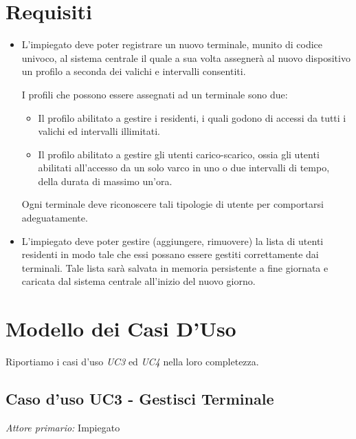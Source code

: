 \documentclass[12pt, letterpaper]{article}
\begin{document}
\section{Requisiti}
\begin{itemize}
    \item L'impiegato deve poter registrare 
    un nuovo terminale, munito di codice 
    univoco, al sistema centrale il quale a 
    sua volta assegnerà al nuovo dispositivo 
    un profilo a seconda dei valichi e intervalli 
    consentiti.
    
    I profili che possono essere assegnati ad un 
    terminale sono due: 
    \begin{itemize}
        \item Il profilo abilitato a gestire i 
        residenti, i quali godono di accessi da 
        tutti i valichi ed intervalli illimitati.
        \item Il profilo abilitato a gestire gli 
        utenti carico-scarico, ossia gli utenti 
        abilitati all'accesso da un solo varco 
        in uno o due intervalli di tempo, della 
        durata di massimo un'ora.
    \end{itemize}
    Ogni terminale deve riconoscere tali tipologie 
    di utente per comportarsi adeguatamente.
    \item L'impiegato deve poter gestire 
    (aggiungere, rimuovere) la lista di utenti 
    residenti in modo tale che essi possano essere 
    gestiti correttamente dai terminali. 
    Tale lista sarà salvata in memoria persistente 
    a fine giornata e caricata dal sistema centrale 
    all'inizio del nuovo giorno.
\end{itemize}

\section{Modello dei Casi D'Uso}
Riportiamo i casi d'uso \emph{UC3} ed \emph{UC4}
nella loro completezza.

\subsection{Caso d'uso UC3 - Gestisci Terminale}

\emph{Attore primario: } Impiegato
\end{document}
